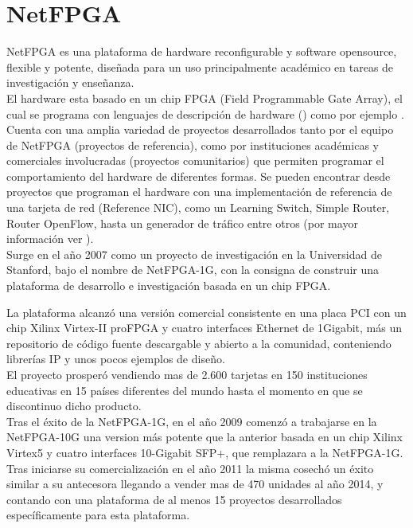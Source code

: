 \section{NetFPGA}
\label{section2.9}

NetFPGA\cite{NetFPGA1} es una plataforma de hardware reconfigurable y software opensource, flexible y potente, diseñada para un uso principalmente académico en tareas de investigación y enseñanza.\\

El hardware esta basado en un chip FPGA (Field Programmable Gate Array), el cual se programa con lenguajes de descripci\'on de hardware () como por ejemplo . Cuenta con una amplia variedad de proyectos desarrollados tanto por el equipo de NetFPGA (proyectos de referencia), como por instituciones académicas y comerciales involucradas (proyectos comunitarios) que permiten programar el comportamiento del hardware  de diferentes formas. Se pueden encontrar desde proyectos que programan el hardware con una implementación de referencia de una tarjeta de red (Reference NIC), como un Learning Switch, Simple Router, Router OpenFlow, hasta un generador de tr\'afico entre otros (por mayor informaci\'on ver \citep{NetFPGA2}).\\ 

Surge en el año 2007 como un proyecto de investigación en la Universidad de Stanford, bajo el nombre de NetFPGA-1G, con la consigna de construir una plataforma de desarrollo e investigación basada en un chip FPGA.
 
La plataforma alcanz\'o una versi\'on comercial consistente en una placa PCI con un chip Xilinx Virtex-II proFPGA y cuatro interfaces Ethernet de 1Gigabit, m\'as un repositorio de código fuente descargable y abierto a la comunidad, conteniendo librerías IP y unos pocos ejemplos de diseño.\\

El proyecto prosper\'o vendiendo mas de 2.600 tarjetas en 150 instituciones educativas en 15 países diferentes del mundo hasta el momento en que se discontinuo dicho producto.\\

Tras el éxito de la NetFPGA-1G, en el año 2009 comenzó a trabajarse en la NetFPGA-10G una version m\'as potente que la  anterior basada en un chip Xilinx Virtex5 y cuatro interfaces 10-Gigabit SFP+, que remplazara a la NetFPGA-1G. Tras iniciarse su comercialización en el año 2011 la misma cosech\'o un éxito similar a su antecesora llegando a vender mas de 470 unidades al año 2014, y contando con una plataforma de al menos 15 proyectos desarrollados específicamente para esta plataforma.\\

